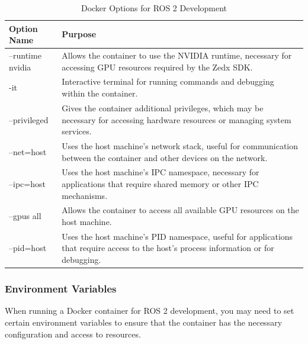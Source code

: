 \begin{table}[H]
    \centering
    \begin{tabular}{|l|p{10cm}|}
        \hline
        \textbf{Option Name} & \textbf{Purpose} \\
        \hline
        --runtime nvidia & Allows the container to use the NVIDIA runtime, necessary for accessing GPU resources required by the Zedx SDK. \\
        \hline
        -it & Interactive terminal for running commands and debugging within the container. \\
        \hline
        --privileged & Gives the container additional privileges, which may be necessary for accessing hardware resources or managing system services. \\
        \hline
        --net=host & Uses the host machine's network stack, useful for communication between the container and other devices on the network. \\
        \hline
        --ipc=host & Uses the host machine's IPC namespace, necessary for applications that require shared memory or other IPC mechanisms. \\
        \hline
        --gpus all & Allows the container to access all available GPU resources on the host machine. \\
        \hline
        --pid=host & Uses the host machine's PID namespace, useful for applications that require access to the host's process information or for debugging. \\
        \hline
    \end{tabular}
    \caption{Docker Options for ROS 2 Development}
    \label{tab:docker-options}
\end{table}

\subsubsection{Environment Variables}
\label{sec:docker-env-vars}
When running a Docker container for ROS 2 development, you may need to set certain environment variables to ensure that the container has the necessary configuration and access to resources. 

